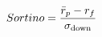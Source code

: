 \documentclass[preview]{standalone}
\begin{document}
\begin{align*}
\special{dvisvgm:raw <g id='unique000'>}Sortino = \frac{\bar{r}_p - r_f}{\sigma_{\text{down}}}\special{dvisvgm:raw </g>}
\end{align*}
\end{document}

